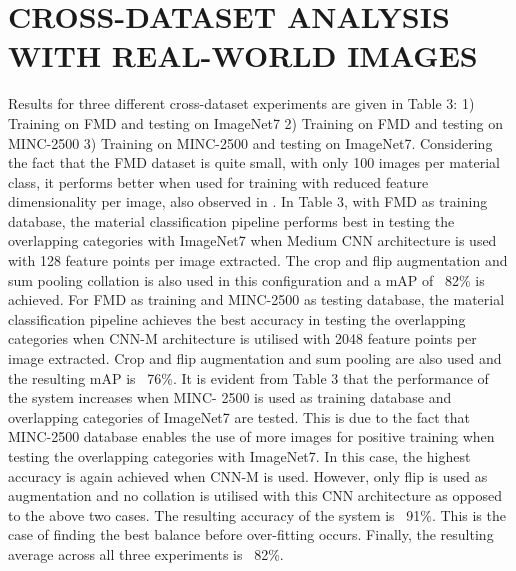 \documentclass[a4paper,twoside]{article}
\begin{document}
\section{\uppercase{CROSS-DATASET ANALYSIS WITH REAL-WORLD IMAGES}}
\noindent Results for three different cross-dataset experiments are given in Table 3: 1) Training on FMD and testing on ImageNet7 2) Training on FMD and testing on MINC-2500 3) Training on MINC-2500 and testing on ImageNet7. Considering the fact that the FMD dataset is quite small, with only 100 images per material class, it performs better when used for training with reduced feature dimensionality per image, also observed in \cite{19}. In Table 3, with FMD as training database, the material classification pipeline performs best in testing the overlapping categories with ImageNet7 when Medium CNN architecture is used with 128 feature points per image extracted. The crop and flip augmentation and sum pooling collation is also used in this configuration and a mAP of ~82\% is achieved.
For FMD as training and MINC-2500 as testing database, the material classification pipeline achieves the best accuracy in testing the overlapping categories when CNN-M architecture is utilised with 2048 feature points per image extracted. Crop and flip augmentation and sum pooling are also used and the resulting mAP is ~76\%. It is evident from Table 3 that the performance of the system increases when MINC- 2500 is used as training database and overlapping categories of ImageNet7 are tested. This is due to the fact that MINC-2500 database enables the use of more images for positive training when testing the overlapping categories with ImageNet7. In this case, the highest accuracy is again achieved when CNN-M is used. However, only flip is used as augmentation and no collation is utilised with this CNN architecture as opposed to the above two cases. The resulting accuracy of the system is ~91\%. This is the case of finding the best balance before over-fitting occurs. Finally, the resulting average across all three experiments is ~82\%.
\end{document}
